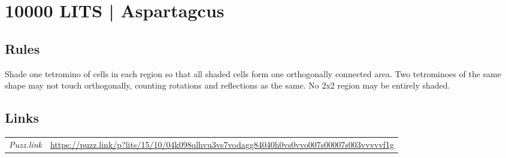 \section{10000 LITS | {\normalfont Aspartagcus}}
\label{sec:56-10000-lits-aspartagcus}

\subsection*{Rules}
\begin{markdown}
Shade one tetromino of cells in each region so that all shaded cells form one orthogonally connected area. Two tetrominoes of the same shape may not touch orthogonally, counting rotations and reflections as the same. No 2x2 region may be entirely shaded.
\end{markdown}
\subsection*{Links}
\begin{tabularx}{\textwidth}{l X}
\emph{Puzz.link} & \url{https://puzz.link/p?lits/15/10/04k098qlhvu3vs7vodagg84040h0vs0vvo007s00007s003vvvvvf1g} \\
\end{tabularx}
\pagebreak
